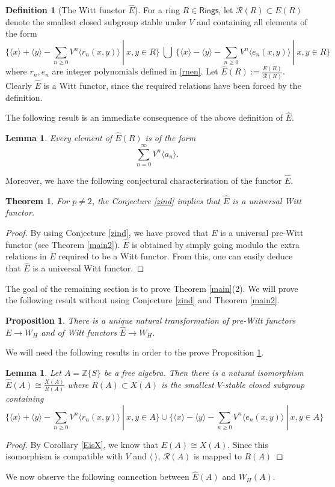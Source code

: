 \documentclass[11pt]{amsart}
\theoremstyle{plain}
\newtheorem{theorem}[thm]{Theorem}
\newtheorem{lemma}[thm]{Lemma}
\newtheorem{proposition}[thm]{Proposition}
\theoremstyle{definition}
\newtheorem{definition}[thm]{Definition}
\newcommand{\Union}{\bigcup}
\newcommand{\union}{\cup}
\newcommand{\sR}{{\mathcal R}}
\newcommand{\Z}{{\mathbb Z}}
\newcommand{\ab}[1]{\langle {#1} \rangle}
\newcommand{\ac}[1]{\{#1\}}
\newcommand{\Rings}{{\mathsf{Rings}}}
\begin{document}
\begin{definition}[The Witt functor $\hat{E}$]\label{defn:ehat}
For a ring $R \in \Rings$, let $\sR(R) \subset E(R)$ denote the smallest closed subgroup stable under $V$  and containing all  
elements of the form 
$$ \{\ab{x}+\ab{y} - \sum_{n\geq 0} V^n \ab{r_n(x,y)} \ | \ x, y \in R\} \ \Union \ \{\ab{x}-\ab{y} - \sum_{n\geq 0} V^n \ab{e_n(x,y)} \ | \ x,y \in R\}$$
where $r_n,e_n$ are integer polynomials defined in \eqref{rnen}. Let $\hat{E}(R):= \frac{E(R)}{\sR(R)}$. Clearly $\hat{E}$ is a Witt functor, since the required relations have been forced by the definition. 
\end{definition}
\noindent The following result is an immediate consequence of the above definition of $\hat{E}$.

\begin{lemma}\label{everyeleofEhat}
Every element of $\hat{E}(R)$ is of the form
\[
  \sum_{n=0}^{\infty} V^{n}\ab{a_n}.
\]
\end{lemma}

\noindent Moreover, we have the following conjectural characterisation of the functor $\hat{E}$.

\begin{theorem}
For $p \neq 2$, the Conjecture \ref{zind} implies that $\hat{E}$ is a universal Witt functor. 
\end{theorem} 
\begin{proof}
By using Conjecture \ref{zind}, we have proved that $E$ is a universal pre-Witt functor (see Theorem \ref{main2}).  $\hat{E}$ is obtained by simply going modulo the extra relations in $E$ required to be a Witt functor. From this, one can easily deduce that $\hat{E}$ is a universal Witt functor.
\end{proof}

\noindent The goal of the remaining section is to prove Theorem \ref{main}(2). We will prove the following result without using Conjecture \ref{zind} and Theorem \ref{main2}. 
 
\begin{proposition}\label{ehattowh}
There is a unique natural transformation of pre-Witt functors $E \to W_H$ and of Witt functors $\hat{E} \to W_H$. 
\end{proposition}
We will need the following results in order to the prove Proposition \ref{ehattowh}.
\begin{lemma}\label{ehatrelation}
Let $A=\Z\ac{S}$ be a free algebra. Then there is a natural isomorphism $\hat{E}(A) \cong \frac{X(A)}{R(A)}$ where
$R(A)\subset X(A)$ is the smallest $V$-stable closed subgroup containing $$ \{\ab{x}+\ab{y} - \sum_{n \geq 0} V^n \ab{r_n(x,y)} \ | \ x, y \in A\} \union \{\ab{x}-\ab{y} - \sum_{n \geq 0}V^n \ab{e_n(x,y)} \ | \ x, y \in A\}$$
\end{lemma}
\begin{proof}
 By Corollary \ref{EisX}, we know that $E(A) \cong X(A)$. Since this isomorphism is compatible with $V$ and $\ab{ \ }$, $\sR(A)$ is mapped to $R(A)$
\end{proof}
\noindent We now observe the following connection between  $\hat{E}(A)$ and $W_H(A)$.
 
\end{document}
